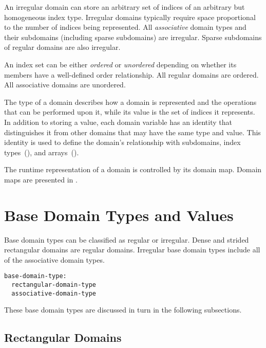 An irregular domain can store an arbitrary set of indices of an arbitrary but
homogeneous index type.  Irregular domains typically require space proportional
to the number of indices being represented.  All \emph{associative} domain types
and their subdomains (including sparse subdomains) are irregular.  Sparse
subdomains of regular domains are also irregular.

An index set can be either \emph{ordered} or \emph{unordered} depending on
whether its members have a well-defined order relationship.  All regular
domains are ordered.  All associative domains are
unordered.

The type of a domain describes how a domain is represented and the operations
that can be performed upon it, while its value is the set of indices it represents.
In addition to storing a value, each domain variable has an identity that
distinguishes it from other domains that may have the same type and
value.  This identity is used to define the domain's relationship
with subdomains, index types~(),
and arrays~().

The runtime representation of a domain is controlled by its domain map.
Domain maps are presented in .


\section{Base Domain Types and Values}
\label{Base_Domain_Types_and_Values}

Base domain types can be classified as regular or irregular.  Dense and
strided rectangular domains are regular domains.
Irregular base domain types include all of the associative domain types.

\begin{syntax}
\begin{verbatim}
base-domain-type:
  rectangular-domain-type
  associative-domain-type
\end{verbatim}
\end{syntax}

These base domain types are discussed in turn in the following
subsections.

\subsection{Rectangular Domains}

